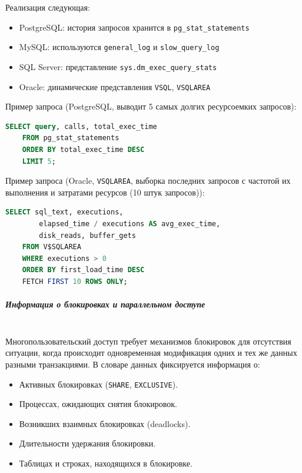 Реализация следующая:
\begin{itemize}
    \item PostgreSQL: история запросов хранится в \texttt{pg\_stat\_statements} \autocite{PgStatStatements1}
    \item MySQL: используются \texttt{general\_log} и \texttt{slow\_query\_log} \autocite{Mysqldoc3}
    \item SQL Server: представление \texttt{sys.dm\_exec\_query\_stats} \autocite{MicrosoftLearnSQLserverQueryStat}
    \item Oracle: динамические представления \texttt{V\textdollar SQL}, \texttt{V\textdollar SQLAREA} \autocite[c.9 §46-49, c.9 §71]{oracledbdoc2}
\end{itemize}

Пример запроса (PostgreSQL, выводит 5 самых долгих ресурсоемких запросов):
\begin{lstlisting}[language=SQL]
    SELECT query, calls, total_exec_time 
    FROM pg_stat_statements 
    ORDER BY total_exec_time DESC 
    LIMIT 5;                 
\end{lstlisting}

Пример запроса (Oracle, \texttt{V\textdollar SQLAREA}, выборка последних запросов с частотой их выполнения и затратами ресурсов (10 штук запросов)):
\begin{lstlisting}[language=SQL]
    SELECT sql_text, executions, 
        elapsed_time / executions AS avg_exec_time, 
        disk_reads, buffer_gets 
    FROM V$SQLAREA 
    WHERE executions > 0 
    ORDER BY first_load_time DESC 
    FETCH FIRST 10 ROWS ONLY;
\end{lstlisting}

\subparagraph{Информация о блокировках и параллельном доступе} ~\\

Многопользовательский доступ требует механизмов блокировок для отсутствия ситуации, когда происходит одновременная модификация одних и тех же данных разными транзакциями. В словаре данных фиксируется информация о:
\begin{itemize}
    \item Активных блокировках (\texttt{SHARE}, \texttt{EXCLUSIVE}).
    \item Процессах, ожидающих снятия блокировок.
    \item Возникших взаимных блокировках (deadlocks).
    \item Длительности удержания блокировки.
    \item Таблицах и строках, находящихся в блокировке.
\end{itemize}

